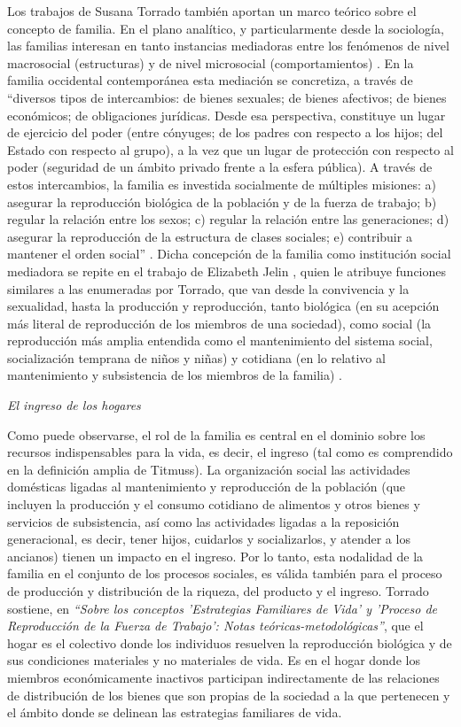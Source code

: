 	Los trabajos de Susana Torrado también aportan un marco teórico sobre el concepto de familia. En el plano analítico, y particularmente desde la sociología, las familias interesan en tanto instancias mediadoras entre los fenómenos de nivel macrosocial (estructuras) y de nivel microsocial (comportamientos) \cite{torrado1998}. En la familia occidental contemporánea esta mediación se concretiza, a través de “diversos tipos de intercambios: de bienes sexuales; de bienes afectivos; de bienes económicos; de obligaciones jurídicas. Desde esa perspectiva, constituye un lugar de ejercicio del poder (entre cónyuges; de los padres con respecto a los hijos; del Estado con respecto al grupo), a la vez que un lugar de protección con respecto al poder (seguridad de un ámbito privado frente a la esfera pública). A través de estos intercambios, la familia es investida socialmente de múltiples misiones: a) asegurar la reproducción biológica de la población y de la fuerza de trabajo; b) regular la relación entre los sexos; c) regular la relación entre las generaciones; d) asegurar la reproducción de la estructura de clases sociales; e) contribuir a mantener el orden social” \cite[p.~15]{torrado2003}. Dicha concepción de la familia como institución social mediadora se repite en el trabajo de Elizabeth Jelin \citeyear{jelin}, quien le atribuye funciones similares a las enumeradas por Torrado, que van desde la convivencia y la sexualidad, hasta la producción y reproducción, tanto biológica (en su acepción más literal de reproducción de los miembros de una sociedad), como social (la reproducción más amplia entendida como el mantenimiento del sistema social, socialización temprana de niños y niñas) y cotidiana (en lo relativo al mantenimiento y subsistencia de los miembros de la familia) \cite[p.~46]{jelin}.
	
	\textit{El ingreso de los hogares}
	
	Como puede observarse, el rol de la familia es central en el dominio sobre los recursos indispensables para la vida, es decir, el ingreso (tal como es comprendido en la definición amplia de Titmuss). La organización social las actividades domésticas ligadas al mantenimiento y reproducción de la población (que incluyen la producción y el consumo cotidiano de alimentos y otros bienes y servicios de subsistencia, así como las actividades ligadas a la reposición generacional, es decir, tener hijos, cuidarlos y socializarlos, y atender a los ancianos) tienen un impacto en el ingreso. Por lo tanto, esta nodalidad de la familia en el conjunto de los procesos sociales, es válida también para el proceso de producción y distribución de la riqueza, del producto y el ingreso. Torrado \citeyear{torrado1981} sostiene, en \textit{“Sobre los conceptos 'Estrategias Familiares de Vida' y 'Proceso de Reproducción de la Fuerza de Trabajo': Notas teóricas-metodológicas”}, que el hogar es el colectivo donde los individuos resuelven la reproducción biológica y de sus condiciones materiales y no materiales de vida. Es en el hogar donde los miembros económicamente inactivos participan indirectamente de las relaciones de distribución de los bienes que son propias de la sociedad a la que pertenecen y el ámbito donde se delinean las estrategias familiares de vida. 
	
